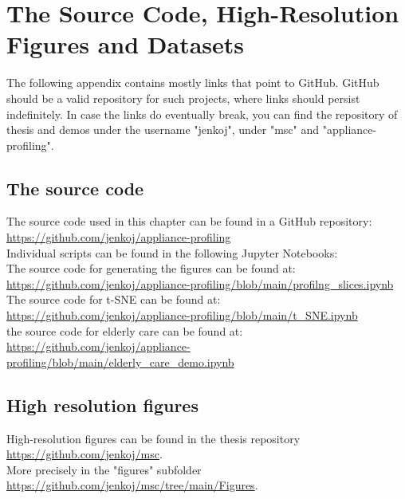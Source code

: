 
\chapter{The Source Code, High-Resolution Figures and Datasets} %

\label{AppendixA} %

The following appendix contains mostly links that point to GitHub.
GitHub should be a valid repository for such projects, where links should persist indefinitely.
In case the links do eventually break, you can find the repository of thesis and demos under the username "jenkoj", under "msc" and "appliance-profiling".

\section{The source code}

The source code used in this chapter can be found in a GitHub repository: \\
\noindent \url{https://github.com/jenkoj/appliance-profiling} \\

\noindent Individual scripts can be found in the following Jupyter Notebooks: \\

\noindent The source code for generating the figures can be found at: \\
\noindent \url{https://github.com/jenkoj/appliance-profiling/blob/main/profilng_slices.ipynb} \\

\noindent The source code for t-SNE can be found at: \\
\noindent \url{https://github.com/jenkoj/appliance-profiling/blob/main/t_SNE.ipynb} \\

\noindent the source code for elderly care can be found at: \\
\noindent \url{https://github.com/jenkoj/appliance-profiling/blob/main/elderly_care_demo.ipynb} \\

\section{High resolution figures}

\noindent High-resolution figures can be found in the thesis repository \url{https://github.com/jenkoj/msc}. \\
\noindent More precisely in the "figures" subfolder \url{https://github.com/jenkoj/msc/tree/main/Figures}. \\

